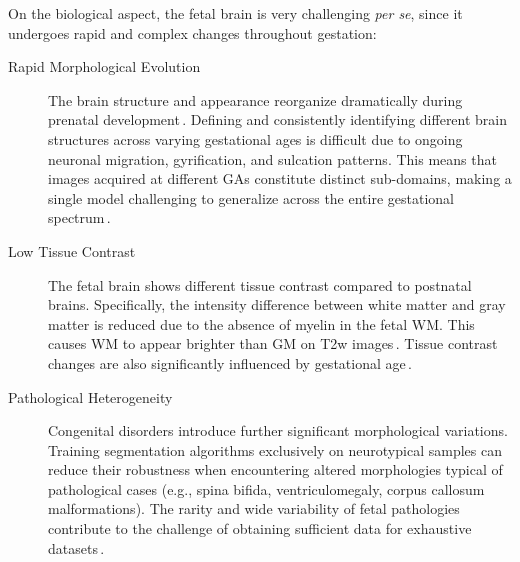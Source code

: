 On the biological aspect, the fetal brain is very challenging \textit{per se}, since it undergoes rapid and complex changes throughout gestation:
\begin{description}
    \item[Rapid Morphological Evolution] The brain structure and appearance reorganize dramatically during prenatal development\,\cite{FeTA2024_paper, Ciceri2023}. Defining and consistently identifying different brain structures across varying gestational ages is difficult due to ongoing neuronal migration, gyrification, and sulcation patterns. This means that images acquired at different GAs constitute distinct sub-domains, making a single model challenging to generalize across the entire gestational spectrum\,\cite{Ciceri2024}.
    \item[Low Tissue Contrast] The fetal brain shows different tissue contrast compared to postnatal brains. Specifically, the intensity difference between white matter and gray matter is reduced due to the absence of myelin in the fetal WM. This causes WM to appear brighter than GM on T2w images\,\cite{Ciceri2023}. Tissue contrast changes are also significantly influenced by gestational age\,\cite{FeTA2024_paper}.
    \item[Pathological Heterogeneity] Congenital disorders introduce further significant morphological variations. Training segmentation algorithms exclusively on neurotypical samples can reduce their robustness when encountering altered morphologies typical of pathological cases (e.g., spina bifida, ventriculomegaly, corpus callosum malformations). The rarity and wide variability of fetal pathologies contribute to the challenge of obtaining sufficient data for exhaustive datasets\,\cite{FeTA2024_paper, FeTA2024_review}.
\end{description}

